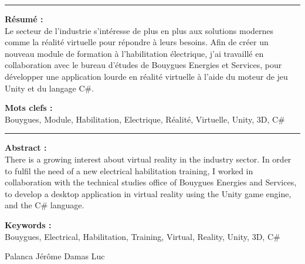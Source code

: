 \documentclass[a4paper]{article}
\begin{document}
    \vspace{10pt}
    \noindent\rule{0.725\paperwidth}{0.4pt}
    
    \vfill 
    \begin{flushleft}
    \huge \textbf{Résumé : } \\
    \vspace{10pt}
    \normalsize Le secteur de l'industrie s'intéresse de plus en plus aux solutions modernes comme la réalité virtuelle pour répondre à leurs besoins. Afin de créer un nouveau module de formation à l'habilitation électrique, j'ai travaillé en collaboration avec le bureau d'études de Bouygues Energies et Services, pour développer une application lourde en réalité virtuelle à l'aide du moteur de jeu Unity et du langage C\#. \\
    \end{flushleft}
    
    \vfill 
    \begin{flushleft}
    \huge \textbf{Mots clefs : } \vspace{2pt} \\
    \vspace{10pt}
    \normalsize Bouygues, Module, Habilitation, Electrique, Réalité, Virtuelle, Unity, 3D, C\#
    \end{flushleft}

    \noindent\rule{0.725\paperwidth}{0.4pt}
    
    \vfill 
    \begin{flushleft}
    \huge \textbf{Abstract : } \\
    \vspace{10pt}
    \normalsize There is a growing interest about virtual reality in the industry sector. In order to fulfil the need of a new electrical habilitation training, I worked in collaboration with the technical studies office of Bouygues Energies and Services, to develop a desktop application in virtual reality using the Unity game engine, and the C\# language.
    \end{flushleft}
    
    \vfill 
    \begin{flushleft}
    \huge \textbf{Keywords : } \\
    \vspace{10pt}
    \normalsize Bouygues, Electrical, Habilitation, Training, Virtual, Reality, Unity, 3D, C\#
    \end{flushleft}

	\vfill
    Palanca Jérôme \hfill Damas Luc
\end{document}
